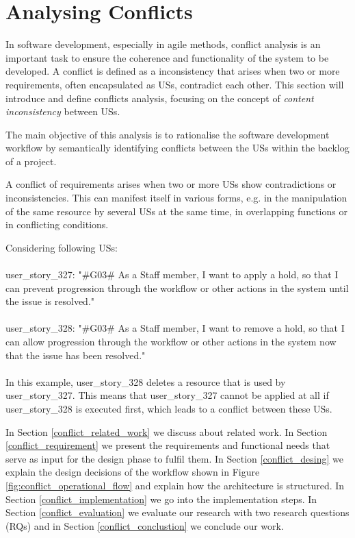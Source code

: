 \section{Analysing Conflicts}\label{conflict}
In software development, especially in agile methods, conflict analysis is an important task to ensure the coherence and functionality of the system to be developed. A conflict is defined as a inconsistency that arises when two or more requirements, often encapsulated as USs, contradict each other. This section will introduce and define conflicts analysis, focusing on the concept of \textit{content inconsistency} between USs.

The main objective of this analysis is to rationalise the software development workflow by semantically identifying conflicts between the USs within the backlog of a project.

A conflict of requirements arises when two or more USs show contradictions or inconsistencies. This can manifest itself in various forms, e.g. in the manipulation of the same resource by several USs at the same time, in overlapping functions or in conflicting conditions.

\begin{example}
	Considering following USs:\\\\
	user\_story\_327: "\#G03\# As a Staff member, I want to apply a hold, so that I can prevent progression through the workflow or other actions in the system until the issue is resolved."\\\\
	user\_story\_328: "\#G03\# As a Staff member, I want to remove a hold, so that I can allow progression through the workflow or other actions in the system now that the issue has been resolved."\\\\
	In this example, user\_story\_328 deletes a resource that is used by user\_story\_327. This means that user\_story\_327 cannot be applied at all if user\_story\_328 is executed first, which leads to a conflict between these USs.
\end{example}

In Section \ref{conflict_related_work} we discuss about related work. In Section \ref{conflict_requirement} we present the requirements and functional needs that serve as input for the design phase to fulfil them. In Section \ref{conflict_desing} we explain the design decisions of the workflow shown in Figure \ref{fig:conflict_operational_flow} and explain how the architecture is structured. In Section \ref{conflict_implementation} we go into the implementation steps. In Section \ref{conflict_evaluation} we evaluate our research with two research questions (RQs) and in Section \ref{conflict_conclustion} we conclude our work.
